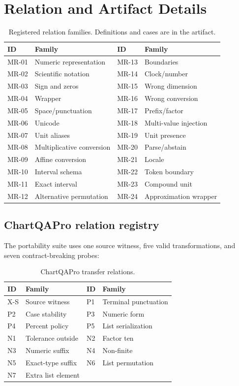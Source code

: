 \section{Relation and Artifact Details}
\label{app:relations}
\begin{table}[H]
\centering
\caption{Registered relation families. Definitions and cases are in the artifact.}
\label{tab:relations}
\scriptsize
\setlength{\tabcolsep}{2.8pt}
\begin{tabular}{llll}
\toprule
ID & Family & ID & Family\\
\midrule
MR-01 & Numeric representation & MR-13 & Boundaries\\
MR-02 & Scientific notation & MR-14 & Clock/number\\
MR-03 & Sign and zeros & MR-15 & Wrong dimension\\
MR-04 & Wrapper & MR-16 & Wrong conversion\\
MR-05 & Space/punctuation & MR-17 & Prefix/factor\\
MR-06 & Unicode & MR-18 & Multi-value injection\\
MR-07 & Unit aliases & MR-19 & Unit presence\\
MR-08 & Multiplicative conversion & MR-20 & Parse/abstain\\
MR-09 & Affine conversion & MR-21 & Locale\\
MR-10 & Interval schema & MR-22 & Token boundary\\
MR-11 & Exact interval & MR-23 & Compound unit\\
MR-12 & Alternative permutation & MR-24 & Approximation wrapper\\
\bottomrule
\end{tabular}
\end{table}
\subsection{ChartQAPro relation registry}
The portability suite uses one source witness, five valid transformations, and seven contract-breaking probes:
\begin{table}[H]
\centering
\caption{ChartQAPro transfer relations.}
\label{tab:chartqapro-relations}
\scriptsize
\setlength{\tabcolsep}{3.1pt}
\begin{tabular}{ll@{\hspace{8pt}}ll}
\toprule
ID & Family & ID & Family\\
\midrule
X-S & Source witness & P1 & Terminal punctuation\\
P2 & Case stability & P3 & Numeric form\\
P4 & Percent policy & P5 & List serialization\\
N1 & Tolerance outside & N2 & Factor ten\\
N3 & Numeric suffix & N4 & Non-finite\\
N5 & Exact-type suffix & N6 & List permutation\\
N7 & Extra list element & & \\
\bottomrule
\end{tabular}
\end{table}

